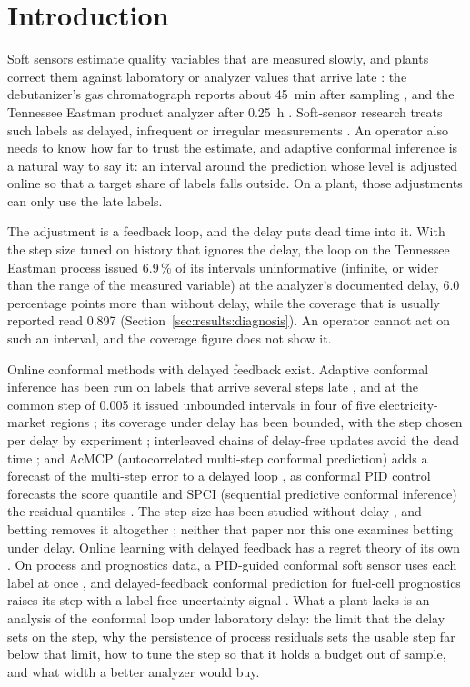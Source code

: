 \section{Introduction}\label{sec:intro}

Soft sensors estimate quality variables that are measured slowly, and plants correct them against
laboratory or analyzer values that arrive late \citep{fortuna2007,kadlec2009}: the debutanizer's
gas chromatograph reports about 45~min after sampling \citep[Sec.~6.2]{fortuna2007}, and the
Tennessee Eastman product analyzer after 0.25~h \citep{downs1993}. Soft-sensor research treats
such labels as delayed, infrequent or irregular measurements \citep{guo2014,shardt2016}. An
operator also needs to know how far to trust the estimate, and adaptive conformal inference
\citep{gibbs2021aci} is a natural way to say it: an interval around the prediction whose level is
adjusted online so that a target share of labels falls outside. On a plant, those adjustments can
only use the late labels.

The adjustment is a feedback loop, and the delay puts dead time into it. With the step size tuned
on history that ignores the delay, the loop on the Tennessee Eastman process issued 6.9\,\% of its
intervals uninformative (infinite, or wider than the range of the measured variable) at the
analyzer's documented delay, 6.0 percentage points more than without delay, while the coverage
that is usually reported read 0.897 (Section~\ref{sec:results:diagnosis}). An operator cannot act
on such an interval, and the coverage figure does not show it.

Online conformal methods with delayed feedback exist. Adaptive conformal inference has been run on
labels that arrive several steps late \citep{dixit2023,szabadvary2024}, and at the common step of
0.005 it issued unbounded intervals in four of five electricity-market regions
\citep{wang2026cf}; its coverage under delay
has been bounded, with the step chosen per delay by experiment \citep{elhalabi2026}; interleaved
chains of delay-free updates avoid the dead time \citep{elhalabi2026,cherenson2026,li2026zhu}; and
AcMCP (autocorrelated multi-step conformal prediction) adds a forecast of the multi-step error to
a delayed loop \citep{wang2024acmcp}, as conformal PID control forecasts the score quantile
\citep{angelopoulos2023pid} and SPCI (sequential predictive conformal inference) the residual
quantiles \citep{xu2023spci}. The step size has been studied without delay \citep{zaffran2022,
angelopoulos2024decay}, and betting removes it altogether \citep{podkopaev2024}; neither that
paper nor this one examines betting under delay. Online learning with delayed feedback has a
regret theory of its own \citep{joulani2013,quanrud2015}. On process and prognostics data, a
PID-guided conformal
soft sensor uses each label at once \citep{meng2026}, and delayed-feedback conformal prediction
for fuel-cell prognostics raises its step with a label-free uncertainty signal \citep{qiu2026}.
What a plant lacks is an analysis of the conformal loop under laboratory delay: the limit that the
delay sets on the step, why the persistence of process residuals sets the usable step far below
that limit, how to tune the step so that it holds a budget out of sample, and what width a better
analyzer would buy.


